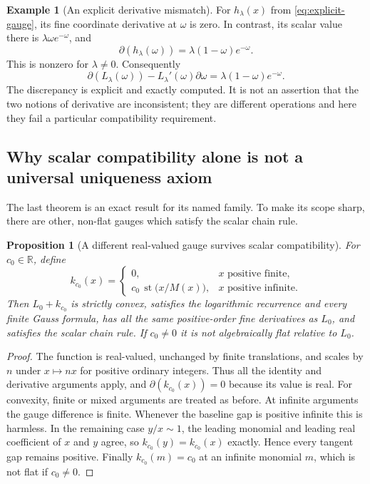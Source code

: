 \documentclass[11pt,letterpaper]{article}
\numberwithin{equation}{section}
\theoremstyle{plain}
\newtheorem{proposition}[proposition]{Proposition}
\theoremstyle{definition}
\newtheorem{example}[example]{Example}
\theoremstyle{remark}
\newcommand{\R}{\mathbb R}
\newcommand{\st}{\operatorname{st}}
\newcommand{\der}{\partial}
\begin{document}
\begin{example}[An explicit derivative mismatch]
For $h_\lambda(x)$ from \eqref{eq:explicit-gauge}, its fine coordinate
derivative at $\omega$ is zero. In contrast, its scalar value there is
$\lambda\omega e^{-\omega}$, and
\begin{equation}\label{eq:BM-defect}
 \der(h_\lambda(\omega))
 =\lambda(1-\omega)e^{-\omega}.
\end{equation}
This is nonzero for $\lambda\ne0$. Consequently
\[
 \der(L_\lambda(\omega))-L_\lambda'(\omega)\der\omega
 =\lambda(1-\omega)e^{-\omega}.
\]
The discrepancy is explicit and exactly computed. It is not an assertion
that the two notions of derivative are inconsistent; they are different
operations and here they fail a particular compatibility requirement.
\end{example}

\subsection{Why scalar compatibility alone is not a universal uniqueness axiom}
The last theorem is an exact result for its named family. To make its scope
sharp, there are other, non-flat gauges which satisfy the scalar chain rule.

\begin{proposition}[A different real-valued gauge survives scalar compatibility]
\label{prop:real-gauge}
For $c_0\in\R$, define
\[
 k_{c_0}(x)=
 \begin{cases}
 0,&x\text{ positive finite},\\
 c_0\,\st\bigl(x/M(x)\bigr),&x\text{ positive infinite}.
 \end{cases}
\]
Then $L_0+k_{c_0}$ is strictly convex, satisfies the logarithmic recurrence
and every finite Gauss formula, has all the same positive-order fine
derivatives as $L_0$, and satisfies the scalar chain rule.
If $c_0\ne0$ it is not algebraically flat relative to $L_0$.
\end{proposition}
\begin{proof}
The function is real-valued, unchanged by finite translations, and scales
by $n$ under $x\mapsto nx$ for positive ordinary integers. Thus all the
identity and derivative arguments apply, and
$\der(k_{c_0}(x))=0$ because its value is real.
For convexity, finite or mixed arguments are treated as before. At infinite
arguments the gauge difference is finite. Whenever the baseline gap is
positive infinite this is harmless. In the remaining case $y/x\sim1$,
the leading monomial and leading real coefficient of $x$ and $y$ agree,
so $k_{c_0}(y)=k_{c_0}(x)$ exactly. Hence every tangent gap remains
positive. Finally $k_{c_0}(m)=c_0$ at an infinite monomial $m$, which is
not flat if $c_0\ne0$.
\end{proof}
\end{document}
